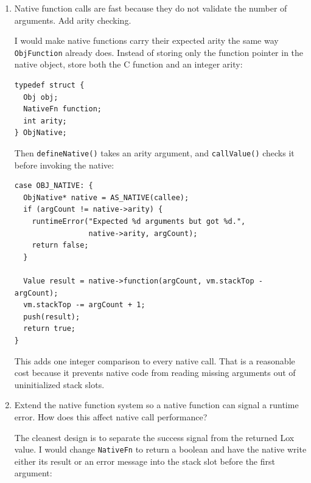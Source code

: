 \documentclass{article}
\begin{document}
\begin{enumerate}
{        I would benchmark one call-heavy program like recursive Fibonacci and one
        loop-heavy program that mostly executes arithmetic and jumps. This optimization
        should help both, but it especially helps the call-heavy case because
        \texttt{ip} is touched constantly while dispatching bytecode. A single digit
        speedup is enough to be worth it here because the added complexity is localized
        to the VM dispatch loop and does not affect the language semantics.
    }

    \item {
        Native function calls are fast because they do not validate the number of
        arguments. Add arity checking.

        I would make native functions carry their expected arity the same way
        \texttt{ObjFunction} already does. Instead of storing only the function pointer
        in the native object, store both the C function and an integer arity:

        \begin{verbatim}
typedef struct {
  Obj obj;
  NativeFn function;
  int arity;
} ObjNative;
        \end{verbatim}

        Then \texttt{defineNative()} takes an arity argument, and \texttt{callValue()}
        checks it before invoking the native:

        \begin{verbatim}
case OBJ_NATIVE: {
  ObjNative* native = AS_NATIVE(callee);
  if (argCount != native->arity) {
    runtimeError("Expected %d arguments but got %d.",
                 native->arity, argCount);
    return false;
  }

  Value result = native->function(argCount, vm.stackTop - argCount);
  vm.stackTop -= argCount + 1;
  push(result);
  return true;
}
        \end{verbatim}

        This adds one integer comparison to every native call. That is a reasonable
        cost because it prevents native code from reading missing arguments out of
        uninitialized stack slots.
    }

    \item {
        Extend the native function system so a native function can signal a runtime
        error. How does this affect native call performance?

        The cleanest design is to separate the success signal from the returned Lox
        value. I would change \texttt{NativeFn} to return a boolean and have the native
        write either its result or an error message into the stack slot before the
        first argument:

}
\end{enumerate}
\end{document}
